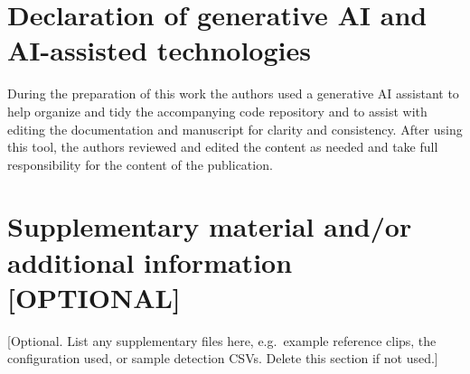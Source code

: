 \documentclass[review,3p,times]{elsarticle}
\begin{document}
\section*{Declaration of generative AI and AI-assisted technologies}

During the preparation of this work the authors used a generative AI assistant
to help organize and tidy the accompanying code repository and to assist with
editing the documentation and manuscript for clarity and consistency. After
using this tool, the authors reviewed and edited the content as needed and take
full responsibility for the content of the publication.

\section*{Supplementary material and/or additional information [OPTIONAL]}

[Optional. List any supplementary files here, e.g.\ example reference clips,
the configuration used, or sample detection CSVs. Delete this section if
not used.]
\end{document}
